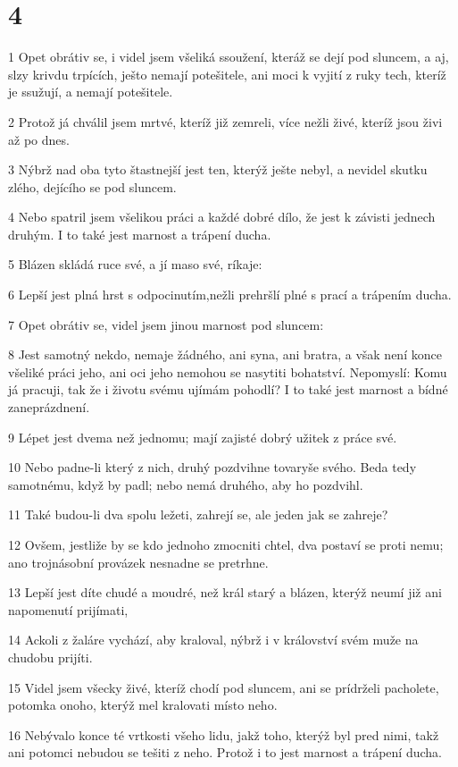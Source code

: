 \chapter{4}

\par 1 Opet obrátiv se, i videl jsem všeliká ssoužení, kteráž se dejí pod sluncem, a aj, slzy krivdu trpících, ješto nemají potešitele, ani moci k vyjití z ruky tech, kteríž je ssužují, a nemají potešitele.
\par 2 Protož já chválil jsem mrtvé, kteríž již zemreli, více nežli živé, kteríž jsou živi až po dnes.
\par 3 Nýbrž nad oba tyto štastnejší jest ten, kterýž ješte nebyl, a nevidel skutku zlého, dejícího se pod sluncem.
\par 4 Nebo spatril jsem všelikou práci a každé dobré dílo, že jest k závisti jednech druhým. I to také jest marnost a trápení ducha.
\par 5 Blázen skládá ruce své, a jí maso své, ríkaje:
\par 6 Lepší jest plná hrst s odpocinutím,nežli prehršlí plné s prací a trápením ducha.
\par 7 Opet obrátiv se, videl jsem jinou marnost pod sluncem:
\par 8 Jest samotný nekdo, nemaje žádného, ani syna, ani bratra, a však není konce všeliké práci jeho, ani oci jeho nemohou se nasytiti bohatství. Nepomyslí: Komu já pracuji, tak že i životu svému ujímám pohodlí? I to také jest marnost a bídné zaneprázdnení.
\par 9 Lépet jest dvema než jednomu; mají zajisté dobrý užitek z práce své.
\par 10 Nebo padne-li který z nich, druhý pozdvihne tovaryše svého. Beda tedy samotnému, když by padl; nebo nemá druhého, aby ho pozdvihl.
\par 11 Také budou-li dva spolu ležeti, zahrejí se, ale jeden jak se zahreje?
\par 12 Ovšem, jestliže by se kdo jednoho zmocniti chtel, dva postaví se proti nemu; ano trojnásobní provázek nesnadne se pretrhne.
\par 13 Lepší jest díte chudé a moudré, než král starý a blázen, kterýž neumí již ani napomenutí prijímati,
\par 14 Ackoli z žaláre vychází, aby kraloval, nýbrž i v království svém muže na chudobu prijíti.
\par 15 Videl jsem všecky živé, kteríž chodí pod sluncem, ani se prídrželi pacholete, potomka onoho, kterýž mel kralovati místo neho.
\par 16 Nebývalo konce té vrtkosti všeho lidu, jakž toho, kterýž byl pred nimi, takž ani potomci nebudou se tešiti z neho. Protož i to jest marnost a trápení ducha.

